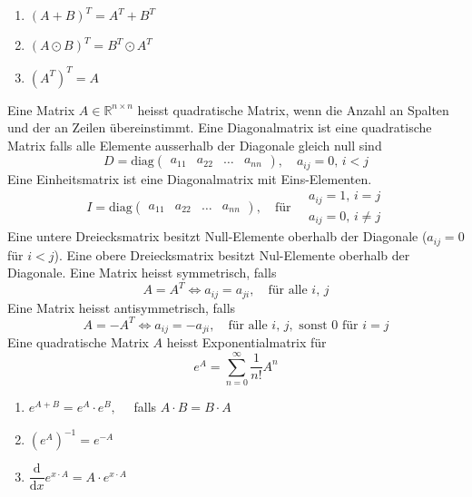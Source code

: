 \begin{enumerate}[$(i)$]
\item $\left(A+B\right)^T=A^T+B^T$
\item $\left(A\odot B\right)^T=B^T\odot A^T$
\item $\left(A^T\right)^T=A$
\end{enumerate}
Eine Matrix $A\in\mathbb{R}^{n\times n}$ heisst quadratische Matrix, wenn die Anzahl an Spalten und der an Zeilen übereinstimmt.
\newline\newline
Eine Diagonalmatrix ist eine quadratische Matrix falls alle Elemente ausserhalb der Diagonale gleich null sind
\begin{equation}
\boxed{D=\text{diag}\begin{pmatrix}a_{11}&a_{22}&\dotso&a_{nn}\end{pmatrix},\quad a_{ij}=0, \,i<j}
\end{equation}
Eine Einheitsmatrix ist eine Diagonalmatrix mit Eins-Elementen.
\begin{equation}
\boxed{I=\text{diag}\begin{pmatrix}a_{11}&a_{22}&\dotso&a_{nn}\end{pmatrix},\quad \text{für}\quad \begin{matrix}a_{ij}=1, \,i=j\\a_{ij}=0, \,i\neq j\end{matrix}}
\end{equation}
Eine untere Dreiecksmatrix besitzt Null-Elemente oberhalb der Diagonale ($a_{ij}=0$ für $i<j$). Eine obere Dreiecksmatrix besitzt Nul-Elemente oberhalb der Diagonale.
\newline\newline
Eine Matrix heisst symmetrisch, falls 
\begin{equation}
\boxed{A=A^T\Leftrightarrow a_{ij}=a_{ji},\quad \text{für alle }i,\,j}
\end{equation}
Eine Matrix heisst antisymmetrisch, falls
\begin{equation}
\boxed{A=-A^T\Leftrightarrow a_{ij}=-a_{ji},\quad \text{für alle }i,\,j,\text{ sonst }0\text{ für }i=j}
\end{equation}
Eine quadratische Matrix $A$ heisst Exponentialmatrix für
\begin{equation}
\boxed{e^A=\displaystyle \sum_{n=0}^{\infty}\dfrac{1}{n!}A^n}
\end{equation}
\begin{enumerate}[$(i)$]
\item $e^{A+B}=e^A\cdot e^B,\quad $ falls $A\cdot B=B\cdot A$
\item $\left(e^A\right)^{-1}=e^{-A}$
\item $\dfrac{\text{d}}{\text{d}x}e^{x\cdot A}=A\cdot e^{x\cdot A}$
\end{enumerate}

